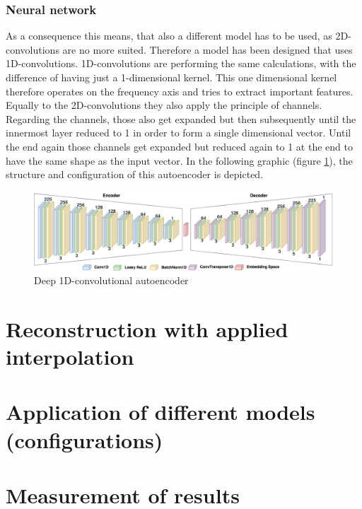 \subsubsection{Neural network}
As a consequence this means, that also a different model has to be used, as 2D-convolutions are no more suited. Therefore a model has been designed that uses 1D-convolutions. 1D-convolutions are performing the same calculations, with the difference of having just a 1-dimensional kernel. This one dimensional kernel therefore operates on the frequency axis and tries to extract important features. Equally to the 2D-convolutions they also apply the principle of channels. Regarding the channels, those also get expanded but then subsequently until the innermost layer reduced to 1 in order to form a single dimensional vector. Until the end again those channels get expanded but reduced again to 1 at the end to have the same shape as the input vector. In the following graphic (figure \ref{fig:cae_1D}), the structure and configuration of this autoencoder is depicted. 

 \begin{figure}[htb!]
	\caption{Deep 1D-convolutional autoencoder}
	\label{fig:cae_1D}
	\centering
	\includegraphics[width=\textwidth]{images/experiments/autoencoder_deep_1D.png}
\end{figure}



\section{Reconstruction with applied interpolation}

\section{Application of different models (configurations)}

\section{Measurement of results}